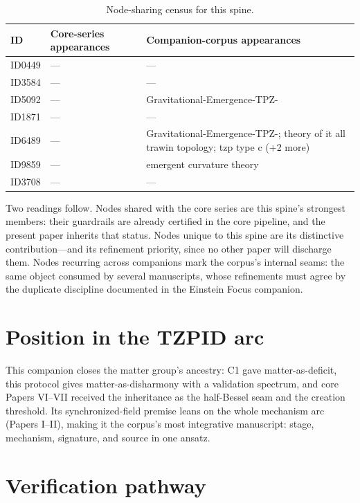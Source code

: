 \documentclass[11pt]{article}
\theoremstyle{remark}
\begin{document}
\begin{table}[ht]
\centering
\small
\caption{Node-sharing census for this spine.}
\label{tab:crosswalk}
\begin{tabular}{lp{4.4cm}p{6.6cm}}
\toprule
ID & Core-series appearances & Companion-corpus appearances \\
\midrule
ID0449 & --- & --- \\
ID3584 & --- & --- \\
ID5092 & --- & Gravitational-Emergence-TPZ- \\
ID1871 & --- & --- \\
ID6489 & --- & Gravitational-Emergence-TPZ-; theory of it all trawin topology; tzp type c (+2 more) \\
ID9859 & --- & emergent curvature theory \\
ID3708 & --- & --- \\
\bottomrule
\end{tabular}
\end{table}

Two readings follow. Nodes shared with the core series are this spine's strongest members: their guardrails are already certified in the core pipeline, and the present paper inherits that status. Nodes unique to this spine are its distinctive contribution---and its refinement priority, since no other paper will discharge them. Nodes recurring across companions mark the corpus's internal seams: the same object consumed by several manuscripts, whose refinements must agree by the duplicate discipline documented in the Einstein Focus companion.

\section{Position in the TZPID arc}
\label{sec:arc}

This companion closes the matter group's ancestry: C1 gave matter-as-deficit, this protocol gives matter-as-disharmony with a validation spectrum, and core Papers VI--VII received the inheritance as the half-Bessel seam and the creation threshold. Its synchronized-field premise leans on the whole mechanism arc (Papers I--II), making it the corpus's most integrative manuscript: stage, mechanism, signature, and source in one ansatz.

\section{Verification pathway}
\label{sec:verify}
\end{document}
